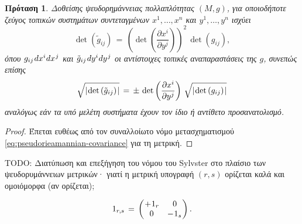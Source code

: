 \documentclass[11pt,a4paper,twoside,openright]{book}
\newtheorem{proposition}[lemma]{Πρόταση}
\begin{document}
\begin{proposition}\label{prop:psr-arbitrary-to-arbitrary}
Δοθείσης ψευδορημάννειας πολλαπλότητας $(M, g)$,
για οποιοδήποτε ζεύγος τοπικών συστημάτων συντεταγμένων
$x^1, \dots, x^n$ και $y^1, \dots, y^n$ ισχύει
\begin{equation}\label{eq:psr-arbitrary-to-arbitrary-quadratic}
\det \left(\tilde{g}_{ij}\right)
\,
=
\,
\left(\det\left(\frac{\partial x^i}{\partial y^j}\right)\right)^2
\,
\det \left( g_{ij} \right),
\end{equation}
όπου $\hspace{.5pt}g_{ij}\hspace{.75pt}dx^i\hspace{.25pt}dx^{\hspace{.5pt}j}$ και
$\hspace{.5pt}\tilde{g}_{ij}\hspace{.75pt}dy^i\hspace{.25pt}dy^{\hspace{.5pt}j}$
οι αντίστοιχες τοπικές αναπαραστάσεις της $g$, συνεπώς επίσης
\begin{equation}\label{eq:psr-arbitrary-to-arbitrary-quadratic-absolute}
\sqrt{\lvert\hspace{.75pt} \det \left(\tilde{g}_{ij}\right) \hspace{.75pt}\rvert}
\,
=
\,
\pm
\,
\det \left( \frac{\partial x^i}{\partial y^j} \right)
\,
\sqrt{\lvert\hspace{.75pt} \det \left(g_{ij}\right) \hspace{.75pt}\rvert}
\end{equation}
αναλόγως εάν τα υπό μελέτη συστήματα έχουν τον ίδιο ή αντίθετο προσανατολισμό.
\end{proposition}
\begin{proof}
Έπεται ευθέως από τον συναλλοίωτο νόμο μετασχηματισμού
\eqref{eq:pseudorieamannian-covariance} για τη μετρική.
\end{proof}

\noindent
TODO: Διατύπωση και επεξήγηση του νόμου του Sylvster στο πλαίσιο των ψευδορυμάννειων μετρικών· γιατί η μετρική υπογραφή $(r, s)$ ορίζεται καλά και ομοιόμορφα (αν ορίζεται);

\begin{equation}\label{(r, s)-matrix}
1_{r,s}
\,
=
\, 
\begin{pmatrix}
\hspace{.75pt}
+\hspace{.5pt}1_r & 0 \\
0 & -\hspace{.5pt}1_s
\hspace{.75pt}
\end{pmatrix}.
\end{equation}
\end{document}
